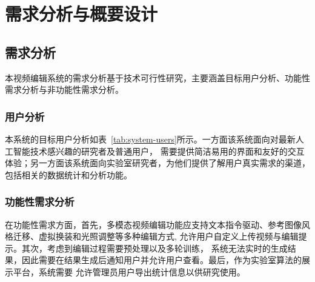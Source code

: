\chapter{需求分析与概要设计}

\section{需求分析}
\label{sec:requirements-analysis}

本视频编辑系统的需求分析基于技术可行性研究，主要涵盖目标用户分析、功能性需求分析与非功能性需求分析。

\subsection{用户分析}

本系统的目标用户分析如表~\ref{tab:system-users}所示。一方面该系统面向对最新人工智能技术感兴趣的研究者及普通用户，
需要提供简洁易用的界面和友好的交互体验；另一方面该系统面向实验室研究者，为他们提供了解用户真实需求的渠道，
包括相关的数据统计和分析功能。


\begin{table}
    \centering
    \label{tab:system-users}
\end{table}

\subsection{功能性需求分析}

在功能性需求方面，首先，多模态视频编辑功能应支持文本指令驱动、参考图像风格迁移、虚拟换装和光照调整等多种编辑方式,
允许用户自定义上传视频与编辑提示。其次，考虑到编辑过程需要预处理以及多轮训练，
系统无法实时的生成结果，因此需要在结果生成后通知用户并允许用户查看。最后，作为实验室算法的展示平台，系统需要
允许管理员用户导出统计信息以供研究使用。

